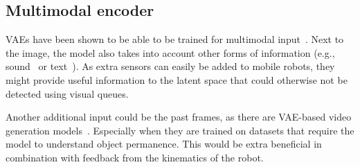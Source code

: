 \subsection{Multimodal encoder}
VAEs have been shown to be able to be trained for multimodal input~\cite{sadok2024multimodal,shi2019variational,sutter2021generalized,suzuki2016joint,wu2018multimodal}. Next to the image, the model also takes into account other forms of information (e.g., sound~\cite{sadok2024multimodal} or text~\cite{suzuki2016joint}). As extra sensors can easily be added to mobile robots, they might provide useful information to the latent space that could otherwise not be detected using visual queues.

Another additional input could be the past frames, as there are VAE-based video generation models~\cite{yan2021videogpt}. Especially when they are trained on datasets that require the model to understand object permanence. This would be extra beneficial in combination with feedback from the kinematics of the robot.
